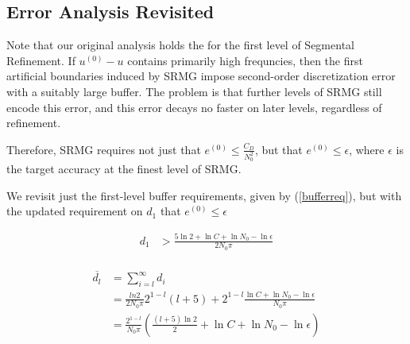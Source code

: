 \documentclass[final]{siamart1116}
\numberwithin{theorem}{section}
\begin{document}


\subsection{Error Analysis Revisited}

Note that our original analysis holds the for the first level of Segmental Refinement. If $u^{(0)} - u$ contains primarily high frequncies, then the first artificial boundaries induced by SRMG impose second-order discretization error with a suitably large buffer. The problem is that further levels of SRMG still encode this error, and this error decays no faster on later levels, regardless of refinement. 

Therefore, SRMG requires not just that $e^{(0)} \leq \frac{C_D}{N_0^2}$, but that $e^{(0)} \leq \epsilon $, where $\epsilon$ is the target accuracy at the finest level of SRMG. 

We revisit just the first-level buffer requirements, given by (\ref{bufferreq}), but with the updated requirement on $d_1$ that $e^{(0)} \leq \epsilon $ 

\begin{align*}
d_1 &> \frac{ 5\ln{2} + \ln{C} + \ln{N_0} - \ln{ \epsilon}  }{2 N_0 \pi } \\
\end{align*}




\begin{align*}
\overline{d_l} &= \sum_{i=l}^\infty d_i \\ 
& = \frac{ln2}{2 N_0 \pi } 2^{1-l}(l+5) + 2^{1-l}\frac{\ln{C} + \ln{N_0} -\ln{\epsilon}}{ N_0 \pi}\\
& = \frac{2^{1-l}}{N_0 \pi } \left( \frac{(l+5)\ln2 }{2} + \ln C + \ln{N_0} - \ln{\epsilon} \right)
\end{align*}
\end{document}
